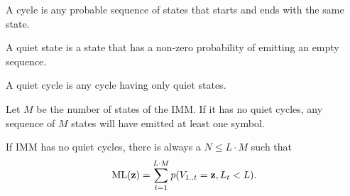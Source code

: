 \begin{definition}
  A cycle is any probable sequence of states that starts and ends with the same state.
\end{definition}

\begin{definition}
  A quiet state is a state that has a non-zero probability of emitting an empty sequence.
\end{definition}

\begin{definition}
  A quiet cycle is any cycle having only quiet states.
\end{definition}

\begin{corollary}
  Let $M$ be the number of states of the IMM. If it has no quiet cycles, any sequence of $M$ states
  will have emitted at least one symbol.
\end{corollary}

If IMM has no quiet cycles, there is always a $N \leq L\cdot M$ such that
\begin{align*}
  \mathrm{ML}(\mathbf{z}) = \sum_{t=1}^{L\cdot M} p(V_{1..t}=\mathbf{z}, L_t<L).
\end{align*}
